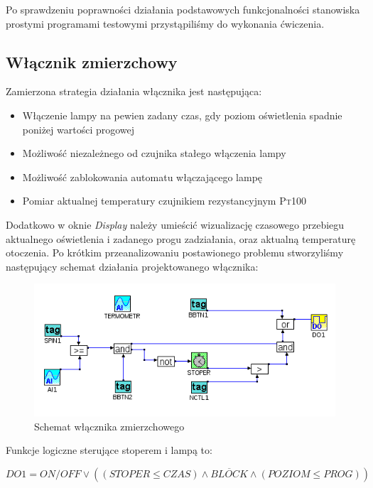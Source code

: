 \documentclass[12pt]{article}
\begin{document}
Po sprawdzeniu poprawności działania podstawowych funkcjonalności stanowiska
prostymi programami testowymi przystąpiliśmy do wykonania ćwiczenia.

\subsection{Włącznik zmierzchowy}

Zamierzona strategia działania włącznika jest następująca:

\begin{itemize}
  \item Włączenie lampy na pewien zadany czas, gdy poziom oświetlenia spadnie
  poniżej wartości progowej
  \item Możliwość niezależnego od czujnika stałego włączenia lampy
  \item Możliwość zablokowania automatu włączającego lampę
  \item Pomiar aktualnej temperatury czujnikiem rezystancyjnym \textsc{Pt100}
\end{itemize}

Dodatkowo w oknie \textit{Display} należy umieścić wizualizację czasowego
przebiegu aktualnego oświetlenia i zadanego progu zadziałania, oraz aktualną
temperaturę otoczenia. Po krótkim przeanalizowaniu postawionego problemu
stworzyliśmy następujący schemat działania projektowanego włącznika:

\begin{figure}[!htb]
	\begin{center}
		\includegraphics[width=\linewidth]{../res/img/task1.png}
	\end{center}
	\caption{Schemat włącznika zmierzchowego}\label{sch:task1}
\end{figure}

Funkcje logiczne sterujące stoperem i lampą to:

\begin{equation*}
	DO1=ON/OFF\vee ((STOPER\leq CZAS)\wedge \overline{BLOCK}\wedge (POZIOM\leq
	PROG))
\end{equation*}
\end{document}
